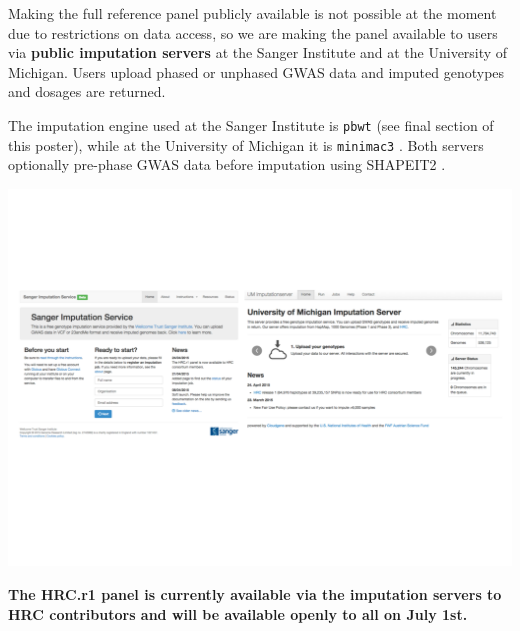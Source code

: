 \documentclass[a0,landscape]{a0poster}
\begin{document}
\begin{multicols}{3}
Making the full reference panel publicly available is not possible at the moment due to restrictions on data access, so we are making the panel available to users via \textbf{public imputation servers} at the Sanger Institute and at the University of Michigan.
Users upload phased or unphased GWAS data and imputed genotypes and dosages are returned.

The imputation engine used at the Sanger Institute is \texttt{pbwt} (see final section of this poster), while at the University of Michigan it is \texttt{minimac3} \cite{fuchsberger2014minimac2}.
Both servers optionally pre-phase GWAS data before imputation using SHAPEIT2 \cite{delaneau2013improved}.

\begin{center}\vspace{0.001cm}
\captionsetup{type=figure}
\includegraphics[width=0.9\linewidth]{images/servers.pdf}
\end{center}\vspace{0.001cm}

\textbf{The HRC.r1 panel is currently available via the imputation servers to HRC contributors and will be available openly to all on July 1st.}



\end{multicols}
\end{document}
